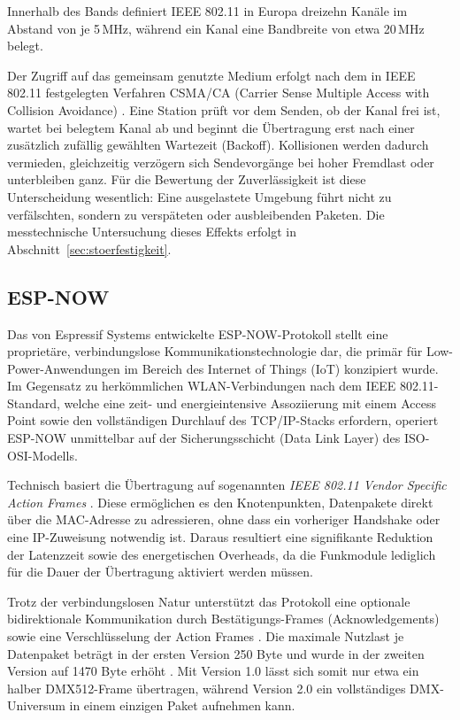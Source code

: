 Innerhalb des Bands definiert IEEE 802.11 in Europa dreizehn Kanäle im Abstand von je
5\,MHz, während ein Kanal eine Bandbreite von etwa 20\,MHz belegt. 

Der Zugriff auf das gemeinsam genutzte Medium erfolgt nach dem in IEEE 802.11
festgelegten Verfahren CSMA/CA (Carrier Sense Multiple Access with Collision
Avoidance) \cite{ieee80211_2024}. Eine Station prüft vor dem Senden, ob der Kanal frei
ist, wartet bei belegtem Kanal ab und beginnt die Übertragung erst nach einer zusätzlich
zufällig gewählten Wartezeit (Backoff). Kollisionen werden dadurch vermieden, gleichzeitig verzögern sich
Sendevorgänge bei hoher Fremdlast oder unterbleiben ganz. Für die Bewertung der
Zuverlässigkeit ist diese Unterscheidung wesentlich: Eine ausgelastete Umgebung führt
nicht zu verfälschten, sondern zu verspäteten oder ausbleibenden Paketen. Die
messtechnische Untersuchung dieses Effekts erfolgt in
Abschnitt~\ref{sec:stoerfestigkeit}.

\subsection{ESP-NOW}
\label{subsec:espnow-protokoll}
Das von Espressif Systems entwickelte ESP-NOW-Protokoll stellt eine proprietäre, verbindungslose 
Kommunikationstechnologie dar, die primär für Low-Power-Anwendungen im Bereich des Internet of Things (IoT) konzipiert wurde. 
Im Gegensatz zu herkömmlichen WLAN-Verbindungen nach dem IEEE 802.11-Standard, welche eine zeit- und 
energieintensive Assoziierung mit einem Access Point sowie den vollständigen Durchlauf des TCP/IP-Stacks erfordern, 
operiert ESP-NOW unmittelbar auf der Sicherungsschicht (Data Link Layer) des ISO-OSI-Modells.

Technisch basiert die Übertragung auf sogenannten \textit{IEEE 802.11 Vendor Specific Action Frames} \cite{espressif_espnow}. 
Diese ermöglichen es den Knotenpunkten, Datenpakete direkt über die MAC-Adresse zu adressieren, ohne dass ein 
vorheriger Handshake oder eine IP-Zuweisung notwendig ist. Daraus resultiert eine signifikante Reduktion 
der Latenzzeit sowie des energetischen Overheads, da die Funkmodule lediglich für die Dauer der Übertragung aktiviert werden müssen.

Trotz der verbindungslosen Natur unterstützt das Protokoll eine optionale bidirektionale 
Kommunikation durch Bestätigungs-Frames (Acknowledgements) sowie eine Verschlüsselung der 
Action Frames \cite{espressif_espnow}. Die maximale Nutzlast 
je Datenpaket beträgt in der ersten Version 250 Byte und wurde in der zweiten 
Version auf 1470 Byte erhöht \cite{espressif_espnow}. Mit Version 1.0 lässt sich somit nur 
etwa ein halber DMX512-Frame übertragen, während Version 2.0 ein vollständiges 
DMX-Universum in einem einzigen Paket aufnehmen kann.


